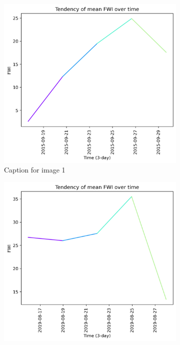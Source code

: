 \begin{figure}[h]
    \centering
    \caption{Caption for the whole figure}
    \begin{subfigure}{0.3\textwidth}
        \centering
        \includegraphics[width=\textwidth]{graphs/2015/15daysprior/2015_15daysprior_tendency_graph_FWI.png}
        \caption{Caption for image 1}
        \label{fig:img1}
    \end{subfigure}
    \hfill
    \begin{subfigure}{0.3\textwidth}
        \centering
        \includegraphics[width=\textwidth]{graphs/2019/15daysprior/2019_15daysprior_tendency_graph_FWI.png}

\end{subfigure}
\end{figure}
